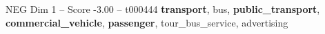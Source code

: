 \begin{textsample}{NEG Dim 1 – Score -3.00 – t000444}  \label{ex:f1_neg_040}
\textbf{transport}, bus, \textbf{public\_transport}, \textbf{commercial\_vehicle}, \textbf{passenger}, tour\_bus\_service, advertising

\end{textsample}
